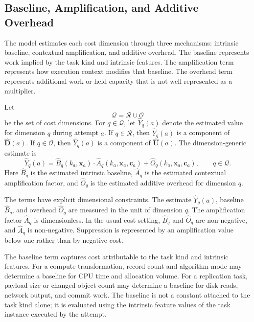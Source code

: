 \subsection{Baseline, Amplification, and Additive Overhead}
\label{sec:cost-baseline-amplification-overhead}

The model estimates each cost dimension through three mechanisms: intrinsic
baseline, contextual amplification, and additive overhead. The baseline
represents work implied by the task kind and intrinsic features. The
amplification term represents how execution context modifies that baseline. The
overhead term represents additional work or held capacity that is not well
represented as a multiplier.

Let
\[
\mathcal{Q} = \mathcal{R} \cup \mathcal{O}
\]
be the set of cost dimensions. For $q \in \mathcal{Q}$, let
$\widehat{Y}_q(a)$ denote the estimated value for dimension $q$ during attempt
$a$. If $q \in \mathcal{R}$, then $\widehat{Y}_q(a)$ is a component of
$\widehat{\mathbf{D}}(a)$. If $q \in \mathcal{O}$, then $\widehat{Y}_q(a)$ is a
component of $\widehat{\mathbf{U}}(a)$. The dimension-generic estimate is
\[
\widehat{Y}_q(a)
=
\widehat{B}_q(k_a, \mathbf{x}_a)
\cdot
\widehat{A}_q(k_a, \mathbf{x}_a, \mathbf{c}_a)
+
\widehat{O}_q(k_a, \mathbf{x}_a, \mathbf{c}_a),
\qquad
q \in \mathcal{Q}.
\]
Here $\widehat{B}_q$ is the estimated intrinsic baseline, $\widehat{A}_q$ is the
estimated contextual amplification factor, and $\widehat{O}_q$ is the estimated
additive overhead for dimension $q$.

The terms have explicit dimensional constraints. The estimate
$\widehat{Y}_q(a)$, baseline $\widehat{B}_q$, and overhead $\widehat{O}_q$ are
measured in the unit of dimension $q$. The amplification factor
$\widehat{A}_q$ is dimensionless. In the usual cost setting,
$\widehat{B}_q$ and $\widehat{O}_q$ are non-negative, and
$\widehat{A}_q$ is non-negative. Suppression is represented by an amplification
value below one rather than by negative cost.

The baseline term captures cost attributable to the task kind and intrinsic
features. For a compute transformation, record count and algorithm mode may
determine a baseline for CPU time and allocation volume. For a replication task,
payload size or changed-object count may determine a baseline for disk reads,
network output, and commit work. The baseline is not a constant attached to the
task kind alone; it is evaluated using the intrinsic feature values of the task
instance executed by the attempt.

